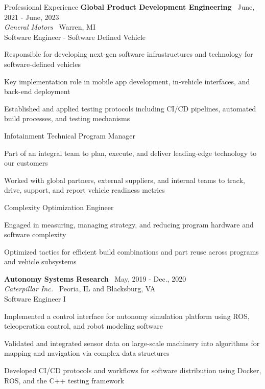\documentclass{resume}
\begin{document}
\begin{rSection}{Professional Experience}
{\bf Global Product Development Engineering} \hfill {\ June, 2021 - June, 2023 }\\ 
\emph{General Motors} \hfill {\ {Warren, MI}}\\
{Software Engineer - Software Defined Vehicle}
\begin{cvitems}
    \item Responsible for developing next-gen software infrastructures and technology for software-defined vehicles
    \item Key implementation role in mobile app development, in-vehicle interfaces, and back-end deployment
    \item Established and applied testing protocols including CI/CD pipelines, automated build processes, and testing mechanisms
\end{cvitems}
{Infotainment Technical Program Manager}
\begin{cvitems}
    \item Part of an integral team to plan, execute, and deliver leading-edge technology to our customers
    \item Worked with global partners, external suppliers, and internal teams to track, drive, support, and report vehicle readiness metrics
\end{cvitems}
{Complexity Optimization Engineer}
\begin{cvitems}
    \item Engaged in measuring, managing strategy, and reducing program hardware and software complexity
    \item Optimized tactics for efficient build combinations and part reuse across programs and vehicle subsystems
\end{cvitems}

{\bf Autonomy Systems Research} \hfill {\ May, 2019 - Dec., 2020 }\\ 
\emph{Caterpillar Inc.} \hfill {\ {Peoria, IL and Blacksburg, VA}}\\
{Software Engineer I}
\begin{cvitems}
    \item Implemented a control interface for autonomy simulation platform using ROS, teleoperation control, and robot modeling software
    \item Validated and integrated sensor data on large-scale machinery into algorithms for mapping and navigation via complex data structures
    \item Developed CI/CD protocols and workflows for software distribution using Docker, ROS, and the C++ testing framework
\end{cvitems}

\end{rSection}
\end{document}
